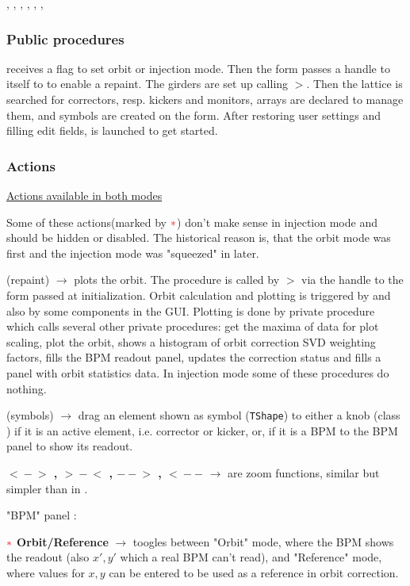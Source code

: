 \documentclass[12pt]{article}
\newcommand{\redast}{{\color{red}\ast}}
\newcommand\code[1]{{\tt #1}}
\newcommand{\ofld}[1]{\colorbox{black!15}{{{\color{black}\bf #1}}}}
\newcommand{\ofldx}[1]{\colorbox{black!15}{{\color{black}(#1)}}}
\newcommand\guico[1]{{\color{blue}\code{#1}}}
\newcommand{\unico}[1]{{\color{burntorange}\code{#1}}}
\newcommand{\evcod}[2]{\ofld{#1} $\rightarrow$ \guico{#2}}
\newcommand{\evcodx}[2]{\ofldx{#1} $\rightarrow$ \guico{#2}}
\newcommand{\prcod}[2]{\opauni{#1}$>$\unico{#2}}
\newcommand{\opagui}[1]{\colorbox{blue!20}{{\color{black}\code{#1}}}}
\newcommand{\ogui}[1]{\hyperref[#1]{\opagui{#1}}}
\newcommand{\opaguif}[1]{\colorbox{violet!30}{{\color{black}\code{#1}}}}
\newcommand{\oguif}[1]{\hyperref[#1]{\opaguif{#1}}}
\newcommand{\opauni}[1]{\colorbox{orange!30}{{\color{black}\code{#1}}}}
\newcommand{\ouni}[1]{\hyperref[#1]{\opauni{#1}}}
\newcommand{\uses}[1]{\flushleft {\bf Uses:} #1}
\newcommand{\act}[1]{\subsubsection*{Actions} #1}
\newcommand{\ppro}[1]{\subsubsection*{Public procedures} #1}
\newcommand{\todo}[1]{{\color{red} #1}}
\begin{document}
\uses{
\oguif{knobframe},  \ouni{linoplib}, \ogui{ostartmenu}, \ouni{globlib}, \ouni{mathlib}, \oguif{../com/asfigure}, \ouni{../com/asaux}
}

\ppro{
\guico{Start} receives a flag to set orbit or injection mode. Then the form passes a handle to itself to \ogui{linoplib} to enable a repaint. The girders are set up calling \prcod{globlib}{GirderSetup}. Then the lattice is searched for correctors, resp. kickers and monitors, arrays are declared to manage them, and symbols are created on the form. After restoring user settings and filling edit fields, \ogui{ostartmenu} is launched to get started.
}

\act{}

\underline{Actions available in both modes}

\todo{Some of these actions(marked by $\redast$) don't make sense in injection mode and should be hidden or disabled. The historical reason is, that the orbit mode was first and the injection mode was "squeezed" in later.}

\evcodx{repaint}{FormPaint} plots the orbit. The procedure is called by \prcod{linoplib}{PlotOrbit} via the handle to the form passed at initialization. Orbit calculation and plotting is triggered by  \ogui{ostartmenu} and also by some components in the GUI. Plotting is done by private procedure \guico{Makeplot} which calls several other private procedures: \guico{Get (Orbit, Cor, Mis) Max} get the maxima of data for plot scaling, \guico{plot(X,Y)} plot the orbit, \guico{WeightPlot} shows a histogram of orbit correction SVD weighting factors, \guico{BPMshow} fills the BPM readout panel,  \guico{LabelShow} updates the correction status and \guico{CodStat} fills a panel with orbit statistics data. In injection mode some of these procedures do nothing.

\evcodx{symbols}{BoxMouse(Down, Up)} drag an element shown as symbol (\code{TShape}) to either a knob (class \oguif{knobframe}) if it is an active element, i.e. corrector or kicker, or, if it is a BPM to the BPM panel \guico{panbpm} to show its readout.

\evcod{$<\!\!-\!\!>$ , $>\!\!-\!\!<$ , $--\!\!>$ , $<\!\!--$}{butzooClick} are zoom functions, similar but simpler than in \ogui{opalinop}.

"BPM" panel \guico{panbpm}:

$\redast$ \evcod{Orbit/Reference}{butBPMmpodeClick} toogles between "Orbit" mode, where the BPM shows the readout (also $x',y'$ which a real BPM can't read), and "Reference" mode, where values for $x, y$ can be entered to be used as a reference in orbit correction.
\end{document}

